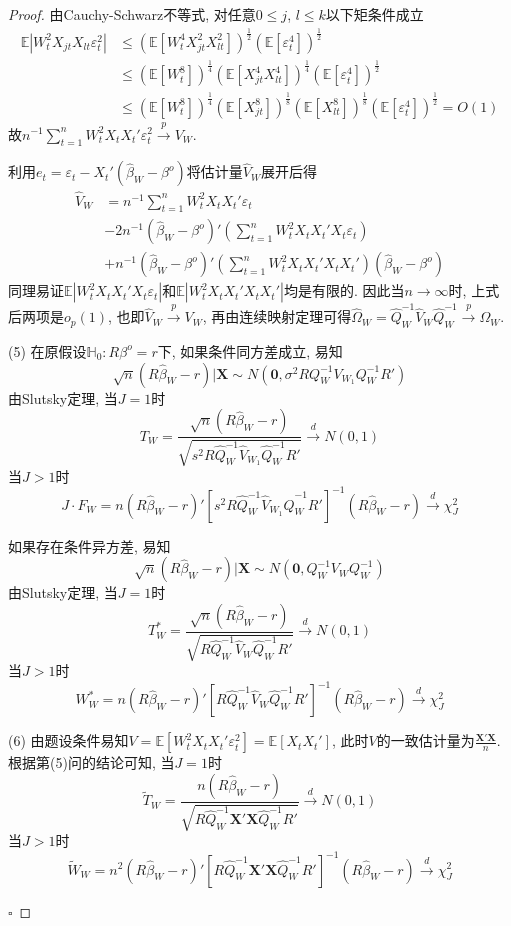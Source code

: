 \documentclass[cn,12pt,math=mtpro2,citestyle=gb7714-2015,bibstyle=gb7714-2015,twocol,mode=simple]{elegantbook}
\newcommand{\E}{\mathbb{E}}
\newcommand{\hbeta}{\hat{\beta}}
\begin{document}
\begin{proof}
    由Cauchy-Schwarz不等式, 对任意$0\leq j$, $l \leq k$以下矩条件成立
    \begin{align*}
    \E|W_t^2X_{jt}X_{lt}\varepsilon_t^2|&\leq(\E[W_t^4X_{jt}^2X_{lt}^2])^{\frac{1}{2}}(\E[\varepsilon_t^4])^{\frac{1}{2}} \\
    &\leq (\E[W_t^8])^{\frac{1}{4}}(\E[X_{jt}^4X_{lt}^4])^{\frac{1}{4}}(\E[\varepsilon_t^4])^{\frac{1}{2}} \\
    &\leq (\E[W_t^8])^{\frac{1}{4}}(\E[X_{jt}^8])^{\frac{1}{8}}(\E[X_{lt}^8])^{\frac{1}{8}}(\E[\varepsilon_t^4])^{\frac{1}{2}} =O(1)
    \end{align*}
    故$\displaystyle n^{-1}\sum_{t=1}^{n}W_t^2X_tX_t'\varepsilon_t^2\xrightarrow{p}V_W$.

    利用$e_t=\varepsilon_t-X_t'(\hbeta_W-\beta^o)$将估计量$\hat{V}_{W}$展开后得
    \begin{align*}
    \hat{V}_{W}&=n^{-1}\sum_{t=1}^{n}W_t^2X_tX_t'\varepsilon_t \\
    &-2n^{-1}(\hbeta_W-\beta^o){'}\left(\sum_{t=1}^{n}W_t^2X_tX_t'X_t\varepsilon_t\right) \\
    &+n^{-1}(\hbeta_W-\beta^o){'}\left(\sum_{t=1}^{n}W_t^2X_tX_t'X_tX_t'\right)(\hbeta_W-\beta^o)
    \end{align*}
    同理易证$\E|W_t^2X_tX_t'X_t\varepsilon_t|$和$\E|W_t^2X_tX_t'X_tX_t'|$均是有限的. 因此当$n\rightarrow\infty$时, 上式后两项是$o_p(1)$, 也即$\hat{V}_{W}\xrightarrow{p}V_{W}$, 再由连续映射定理可得$\hat{\Omega}_{W}=\hat{Q}_W^{-1}\hat{V}_W\hat{Q}_W^{-1}\xrightarrow{p}\Omega_W$.

    (5) 在原假设$\mathbb{H}_0:R\beta^o=r$下, 如果条件同方差成立, 易知
    $$\sqrt{n}(R\hbeta_W-r)|\mathbf{X}\sim N(\mathbf{0}, \sigma^2RQ_W^{-1}V_{W_1}Q_W^{-1}R')$$
    由Slutsky定理, 当$J=1$时
    $$T_W=\frac{\sqrt{n}(R\hbeta_W-r)}{\sqrt{s^2R\hat{Q}_W^{-1}\hat{V}_{W_1}\hat{Q}_W^{-1}R'}}\xrightarrow{d}N(0,1)$$
    当$J>1$时
    $$J\cdot F_W=n(R\hbeta_W-r)'[s^2R\hat{Q}_W^{-1}\hat{V}_{W_1}\hat{Q}_W^{-1}R']^{-1}(R\hbeta_W-r)\xrightarrow{d}\chi_J^2$$

    如果存在条件异方差, 易知
    $$\sqrt{n}(R\hbeta_W-r)|\mathbf{X}\sim N(\mathbf{0}, Q_W^{-1}V_WQ_W^{-1})$$
    由Slutsky定理, 当$J=1$时
    $$T_W^{\ast}=\frac{\sqrt{n}(R\hbeta_W-r)}{\sqrt{R\hat{Q}_{W}^{-1}\hat{V}_W\hat{Q}_W^{-1}R'}}\xrightarrow{d}N(0, 1)$$
    当$J>1$时
    $$W_W^{\ast}=n(R\hbeta_W-r)'[R\hat{Q}_W^{-1}\hat{V}_W\hat{Q}_W^{-1}R']^{-1}(R\hbeta_W-r)\xrightarrow{d}\chi_J^2$$

    (6) 由题设条件易知$V=\E[W_t^2X_tX_t'\varepsilon_t^2]=\E[X_tX_t']$, 此时$V$的一致估计量为$\displaystyle\frac{\mathbf{X}'\mathbf{X}}{n}$. 根据第(5)问的结论可知, 当$J=1$时
    $$\tilde{T}_W=\frac{n(R\hbeta_W-r)}{\sqrt{R\hat{Q}_W^{-1}\mathbf{X}'\mathbf{X}\hat{Q}^{-1}_WR'}}\xrightarrow{d}N(0, 1)$$
    当$J>1$时
    $$\tilde{W}_W=n^2(R\hbeta_W-r)'[R\hat{Q}_W^{-1}\mathbf{X}'\mathbf{X}\hat{Q}_W^{-1}R']^{-1}(R\hbeta_W-r)\xrightarrow{d}\chi_J^2$$

        $\square$
  \end{proof}
\end{document}
